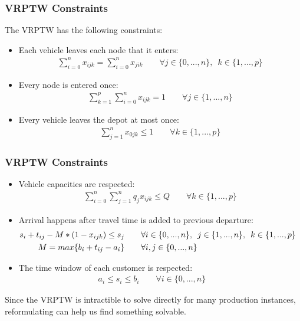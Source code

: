 \documentclass{beamer}
\begin{document}
	\begin{frame}[t]
		\frametitle{VRPTW Constraints}
		\footnotesize
		\vspace{-.25cm}
		The VRPTW has the following constraints:
		\begin{itemize}
			\item Each vehicle leaves each node that it enters:
			\begin{align}
				\sum_{i = 0}^{n}{x_{ijk}} = \sum_{i = 0}^{n}{x_{jik}} \qquad \forall j \in \{0,...,n\}, \enspace k \in \{1,...,p\} \label{c:leave_all}
			\end{align}
			\item Every node is entered once:
			\begin{align}
				\sum_{k = 1}^{p}{\sum_{i = 0}^{n}{x_{ijk}}} = 1  \qquad \forall j \in \{1,...,n\} \label{c:visit_all}
			\end{align}
			\item Every vehicle leaves the depot at most once:
			\begin{align}
				\sum_{j = 1}^{n}{x_{0jk}} \leq 1 \qquad \forall k \in \{1,...,p\} \label{c:leave_depot}
			\end{align}
		\end{itemize}
		\normalsize
	\end{frame}

	\begin{frame}[t]
		\frametitle{VRPTW Constraints}
		\footnotesize
		\vspace{-.25cm}
		\begin{itemize}
			\item Vehicle capacities are respected:
			\begin{align}
				\sum_{i = 0}^{n}{\sum_{j = 1}^{n}{q_{j} x_{ijk}}} \leq Q \qquad \forall k \in \{1,...,p\} \label{c:capacity}
			\end{align}
			\item Arrival happens after travel time is added to previous departure:
			\begin{align}
				s_i + t_{ij} - M * (1 - x_{ijk}) \leq s_j &\qquad \forall i \in \{0,...,n\}, \enspace j \in \{1,...,n\}, \enspace k \in \{1,...,p\} \qquad \label{c:travel_times} \\
				M = max \{b_i + t_{ij} - a_i\} &\qquad \forall i,j \in \{0,...,n\} \notag
			\end{align}
			\item The time window of each customer is respected:
			\begin{align}
				\qquad \qquad \qquad \qquad a_i \leq s_i \leq b_i \qquad \forall i \in \{0,...,n\} \qquad \qquad \qquad \qquad \qquad \label{c:time_windows}
			\end{align}
		\end{itemize}
		\vspace{.5cm}
		\begin{block}{}
			Since the VRPTW is intractible to solve directly for many production instances, reformulating can help us find something solvable.
		\end{block}
		\normalsize
	\end{frame}
\end{document}
